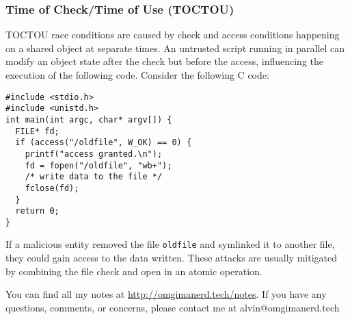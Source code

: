 \documentclass{math}
\begin{document}
\subsubsection*{Time of Check/Time of Use (TOCTOU)}
TOCTOU race conditions are caused by check and access conditions happening on
a shared object at separate times. An untrusted script running in parallel can
modify an object state after the check but before the access, influencing the
execution of the following code. Consider the following C code:
\begin{lstlisting}
#include <stdio.h>
#include <unistd.h>
int main(int argc, char* argv[]) {
  FILE* fd;
  if (access("/oldfile", W_OK) == 0) {
    printf("access granted.\n");
    fd = fopen("/oldfile", "wb+");
    /* write data to the file */
    fclose(fd);
  }
  return 0;
}
\end{lstlisting}
If a malicious entity removed the file \texttt{oldfile} and symlinked it to
another file, they could gain access to the data written. These attacks are
usually mitigated by combining the file check and open in an atomic operation.

\begin{center}
  You can find all my notes at \url{http://omgimanerd.tech/notes}. If you have
  any questions, comments, or concerns, please contact me at
  alvin@omgimanerd.tech
\end{center}
\end{document}
